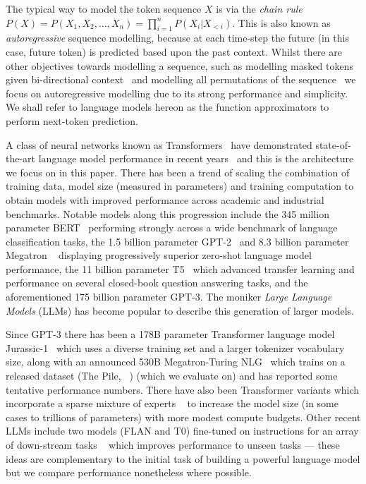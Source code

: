 The typical way to model the token sequence $X$ is via the \textit{chain rule} $P(X) = P(X_1, X_2, \ldots, X_n) = \prod_{i=1}^n P(X_i | X_{<i})$. This is also known as \textit{autoregressive} sequence modelling, because at each time-step the future (in this case, future token) is predicted based upon the past context. Whilst there are other objectives towards modelling a sequence, such as modelling masked tokens given bi-directional context~\citep{mikolov2013efficient, devlin2019bert} and modelling all permutations of the sequence~\citep{yang2019xlnet} we focus on autoregressive modelling due to its strong performance and simplicity. We shall refer to language models hereon as the function approximators to perform next-token prediction.

A class of neural networks known as Transformers~\citep{vaswani2017attention} have demonstrated state-of-the-art language model performance in recent years~\citep{dai2019transformer, radford2018improving, radford2019language} and this is the architecture we focus on in this paper. There has been a trend of scaling the combination of training data, model size (measured in parameters) and training computation to obtain models with improved performance across academic and industrial benchmarks. Notable models along this progression include the 345 million parameter BERT~\citep{devlin2019bert} performing strongly across a wide benchmark of language classification tasks, the 1.5 billion parameter GPT-2~\citep{radford2018improving} and 8.3 billion parameter Megatron ~\citep{shoeybi2019megatron} displaying progressively superior zero-shot language model performance, the 11 billion parameter T5~\citep{raffel2019exploring} which advanced transfer learning and performance on several closed-book question answering tasks, and the aforementioned 175 billion parameter GPT-3. The moniker \textit{Large Language Models} (LLMs) has become popular to describe this generation of larger models.

Since GPT-3 there has been a 178B parameter Transformer language model Jurassic-1~\citep{jurassic} which uses a diverse training set and a larger tokenizer vocabulary size, along with an announced 530B Megatron-Turing NLG~\citep{Megatron-Turing} which trains on a released dataset (The Pile, ~\citet{pile}) (which we evaluate on) and has reported some tentative performance numbers. There have also been Transformer variants which incorporate a sparse mixture of experts ~\citep{fedus2021switch, roller2021hash} to increase the model size (in some cases to trillions of parameters) with more modest compute budgets. Other recent LLMs include two models (FLAN and T0) fine-tuned on instructions for an array of down-stream tasks ~\citep{sanh2021multitask, wei2021finetuned} which improves performance to unseen tasks --- these ideas are complementary to the initial task of building a powerful language model but we compare performance nonetheless where possible.

